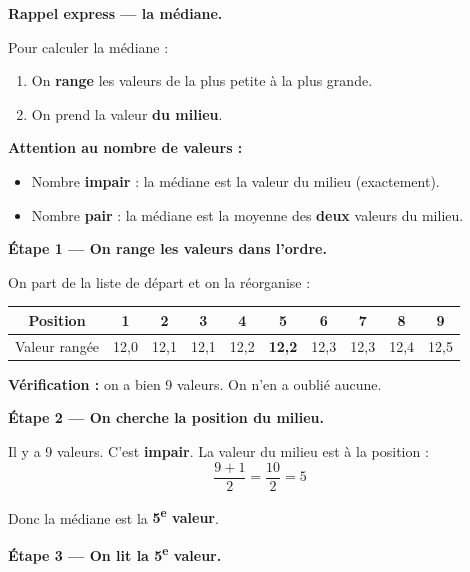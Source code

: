 \documentclass[12pt,a4paper]{article}
\begin{document}
\begin{rappelcible}
\textbf{Rappel express — la médiane.}

\vspace{0.2cm}
Pour calculer la médiane :
\begin{enumerate}[leftmargin=*]
  \item On \textbf{range} les valeurs de la plus petite à la plus grande.
  \item On prend la valeur \textbf{du milieu}.
\end{enumerate}

\vspace{0.2cm}
\textbf{Attention au nombre de valeurs :}
\begin{itemize}[leftmargin=*]
  \item Nombre \textbf{impair} : la médiane est la valeur du milieu (exactement).
  \item Nombre \textbf{pair} : la médiane est la moyenne des \textbf{deux} valeurs du milieu.
\end{itemize}
\end{rappelcible}

\vspace{0.3cm}
\textbf{Étape 1 — On range les valeurs dans l'ordre.}

On part de la liste de départ et on la réorganise :

\begin{center}
\begin{tabular}{|c|c|c|c|c|c|c|c|c|c|}
\hline
Position & 1 & 2 & 3 & 4 & 5 & 6 & 7 & 8 & 9 \\
\hline
Valeur rangée & 12,0 & 12,1 & 12,1 & 12,2 & \textbf{12,2} & 12,3 & 12,3 & 12,4 & 12,5 \\
\hline
\end{tabular}
\end{center}

\textbf{Vérification :} on a bien 9 valeurs. On n'en a oublié aucune.

\vspace{0.3cm}
\textbf{Étape 2 — On cherche la position du milieu.}

Il y a 9 valeurs. C'est \textbf{impair}. La valeur du milieu est à la position :
\[
\frac{9+1}{2} = \frac{10}{2} = 5
\]

Donc la médiane est la \textbf{5\textsuperscript{e} valeur}.

\vspace{0.3cm}
\textbf{Étape 3 — On lit la 5\textsuperscript{e} valeur.}
\end{document}
